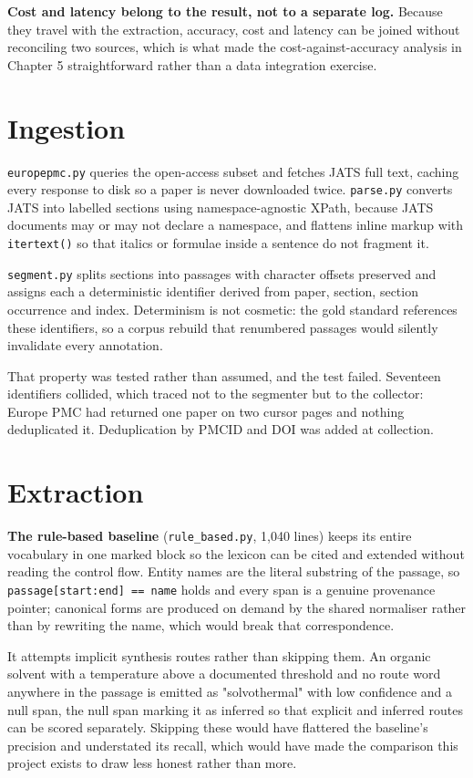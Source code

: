 \documentclass[11pt,a4paper,oneside]{report}
\begin{document}
\textbf{Cost and latency belong to the result, not to a separate log.} Because they travel with the extraction, accuracy, cost and latency can be joined without reconciling two sources, which is what made the cost-against-accuracy analysis in Chapter 5 straightforward rather than a data integration exercise.

\section{Ingestion}

\texttt{europepmc.\allowbreak{}py} queries the open-access subset and fetches JATS full text, caching every response to disk so a paper is never downloaded twice. \texttt{parse.\allowbreak{}py} converts JATS into labelled sections using namespace-agnostic XPath, because JATS documents may or may not declare a namespace, and flattens inline markup with \texttt{itertext()} so that italics or formulae inside a sentence do not fragment it.

\texttt{segment.\allowbreak{}py} splits sections into passages with character offsets preserved and assigns each a deterministic identifier derived from paper, section, section occurrence and index. Determinism is not cosmetic: the gold standard references these identifiers, so a corpus rebuild that renumbered passages would silently invalidate every annotation.

That property was tested rather than assumed, and the test failed. Seventeen identifiers collided, which traced not to the segmenter but to the collector: Europe PMC had returned one paper on two cursor pages and nothing deduplicated it. Deduplication by PMCID and DOI was added at collection.

\section{Extraction}

\textbf{The rule-based baseline} (\texttt{rule\_\allowbreak{}based.\allowbreak{}py}, 1,040 lines) keeps its entire vocabulary in one marked block so the lexicon can be cited and extended without reading the control flow. Entity names are the literal substring of the passage, so \texttt{passage[start:end] == name} holds and every span is a genuine provenance pointer; canonical forms are produced on demand by the shared normaliser rather than by rewriting the name, which would break that correspondence.

It attempts implicit synthesis routes rather than skipping them. An organic solvent with a temperature above a documented threshold and no route word anywhere in the passage is emitted as "solvothermal" with low confidence and a null span, the null span marking it as inferred so that explicit and inferred routes can be scored separately. Skipping these would have flattered the baseline's precision and understated its recall, which would have made the comparison this project exists to draw less honest rather than more.
\end{document}
